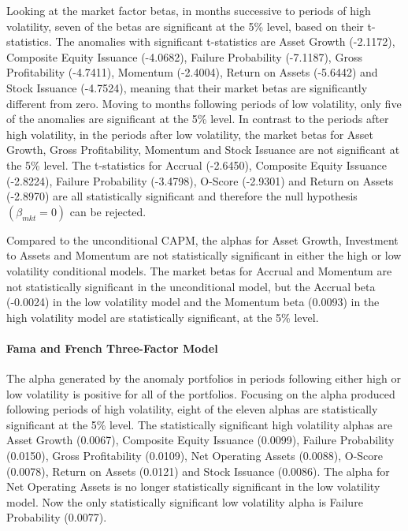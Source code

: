 \documentclass[12pt, a4paper, oneside]{article}
\begin{document}
Looking at the market factor betas, in months successive to periods of high volatility, seven of the betas are significant at the 5\% level, based on their t-statistics. The anomalies with significant t-statistics are Asset Growth (-2.1172), Composite Equity Issuance (-4.0682), Failure Probability (-7.1187), Gross Profitability (-4.7411), Momentum (-2.4004), Return on Assets (-5.6442) and Stock Issuance (-4.7524), meaning that their market betas are significantly different from zero. Moving to months following periods of low volatility, only five of the anomalies are significant at the 5\% level. In contrast to the periods after high volatility, in the periods after low volatility, the market betas for Asset Growth, Gross Profitability, Momentum and Stock Issuance are not significant at the 5\% level. The t-statistics for Accrual (-2.6450), Composite Equity Issuance (-2.8224), Failure Probability (-3.4798), O-Score (-2.9301) and Return on Assets (-2.8970) are all statistically significant and therefore the null hypothesis $(\beta_{mkt}= 0)$ can be rejected.

Compared to the unconditional CAPM, the alphas for Asset Growth, Investment to Assets and Momentum are not statistically significant in either the high or low volatility conditional models. The market betas for Accrual and Momentum are not statistically significant in the unconditional model, but the Accrual beta (-0.0024) in the low volatility model and the Momentum beta (0.0093) in the high volatility model are statistically significant, at the 5\% level. 

\paragraph{Fama and French Three-Factor Model}
The alpha generated by the anomaly portfolios in periods following either high or low volatility is positive for all of the portfolios. Focusing on the alpha produced following periods of high volatility, eight of the eleven alphas are statistically significant at the 5\% level. The statistically significant high volatility alphas are Asset Growth (0.0067), Composite Equity Issuance (0.0099), Failure Probability (0.0150), Gross Profitability (0.0109), Net Operating Assets (0.0088), O-Score (0.0078), Return on Assets (0.0121) and Stock Issuance (0.0086). The alpha for Net Operating Assets is no longer statistically significant in the low volatility model. Now the only statistically significant low volatility alpha is Failure Probability (0.0077). 
\end{document}
